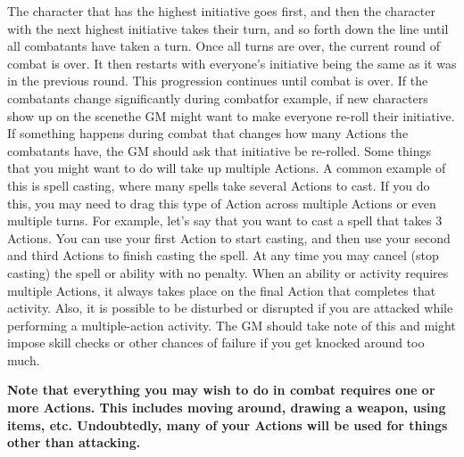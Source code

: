 \documentclass[twoside]{book}
\begin{document}
  

  

   The character that has the highest initiative goes
             first, and then the character with the next highest
             initiative takes their turn, and so forth down the line
             until all combatants have taken a turn.  Once all turns are over, the current round of combat
             is over. It then restarts with everyone's initiative
             being the same as it was in the previous round. This
             progression continues until combat is over. If the
             combatants change significantly during combatfor
             example, if new characters show up on the scenethe GM
             might want to make everyone re-roll their initiative. If
             something happens during combat that changes how many
             Actions the combatants have, the GM should ask that
             initiative be re-rolled.  Some things that you might want to do will take up
             multiple Actions. A common example of this is spell casting,
             where many spells take several Actions to cast. If you do
             this, you may need to drag this type of Action across
             multiple Actions or even multiple turns. For example,
             let's say that you want to cast a spell that takes 3
             Actions. You can use your first Action to start casting, and
             then use your second and third Actions to finish casting the
             spell. At any time you may cancel (stop casting) the spell
             or ability with no penalty. When an ability or activity
             requires multiple Actions, it always takes place on the
             final Action that completes that activity. Also, it is
             possible to be disturbed or disrupted if you are attacked
             while performing a multiple-action activity. The GM should
             take note of this and might impose skill checks or other
             chances of failure if you get knocked around too much.
             

 \textbf{ Note that everything you may wish to do in combat
             requires one or more Actions. This includes moving around,
             drawing a weapon, using items, etc. Undoubtedly, many of
             your Actions will be used for things other than attacking.
             }
\end{document}

